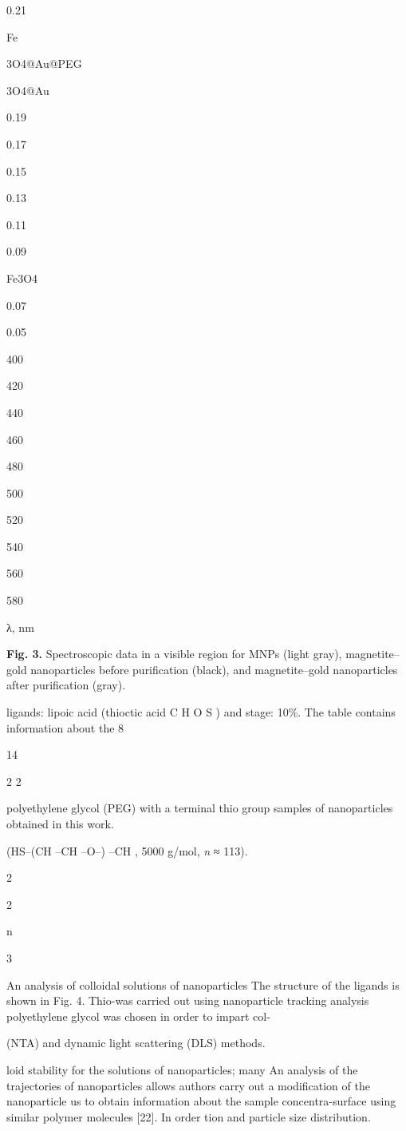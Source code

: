 \documentclass[12pt,a4paper]{article}
\begin{document}
0.21

Fe

3O4@Au@PEG

3O4@Au

0.19

0.17

0.15

0.13

0.11

0.09

Fe3O4

0.07

0.05

400

420

440

460

480

500

520

540

560

580

λ, nm

\textbf{Fig. 3.} Spectroscopic data in a visible region for MNPs (light
gray), magnetite--gold nanoparticles before purification (black), and
magnetite--gold nanoparticles after purification (gray).

ligands: lipoic acid (thioctic acid C H O S ) and stage: 10\%. The table
contains information about the 8

14

2 2

polyethylene glycol (PEG) with a terminal thio group samples of
nanoparticles obtained in this work.

(HS--(CH --CH --O--) --CH , 5000 g/mol, \emph{n} ≈ 113).

2

2

n

3

An analysis of colloidal solutions of nanoparticles The structure of the
ligands is shown in Fig. 4. Thio-was carried out using nanoparticle
tracking analysis polyethylene glycol was chosen in order to impart col-

(NTA) and dynamic light scattering (DLS) methods.

loid stability for the solutions of nanoparticles; many An analysis of
the trajectories of nanoparticles allows authors carry out a
modification of the nanoparticle us to obtain information about the
sample concentra-surface using similar polymer molecules {[}22{]}. In
order tion and particle size distribution.
\end{document}
